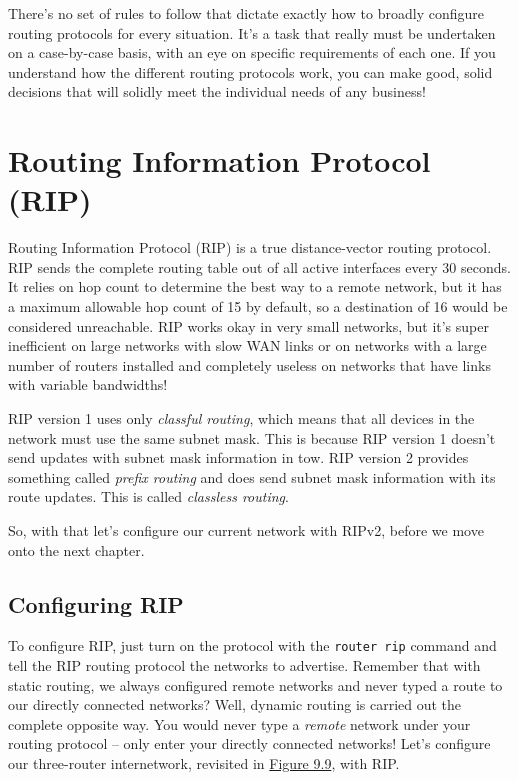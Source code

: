 There's no set of rules to follow that dictate exactly how to broadly configure routing protocols for every situation.
It's a task that really must be undertaken on a case-by-case basis, with an eye on specific requirements of each one.
If you understand how the different routing protocols work, you can make good, solid decisions that will solidly meet the individual needs of any business!



\section{Routing Information Protocol (RIP)}

Routing Information Protocol (RIP) is a true distance-vector routing
protocol. RIP sends the complete routing table out of all active
interfaces every 30 seconds. It relies on hop count to determine the
best way to a remote network, but it has a maximum allowable hop count
of 15 by default, so a destination of 16 would be considered
unreachable. RIP works okay in very small networks, but it's super
inefficient on large networks with slow WAN
\protect\hypertarget{c09.xhtmlux5cux23Page_393}{}{}links or on networks
with a large number of routers installed and completely useless on
networks that have links with variable bandwidths!

RIP version 1 uses only \emph{classful routing}, which means that all
devices in the network must use the same subnet mask. This is because
RIP version 1 doesn't send updates with subnet mask information in tow.
RIP version 2 provides something called \emph{prefix routing} and does
send subnet mask information with its route updates. This is called
\emph{classless routing}.

So, with that let's configure our current network with RIPv2, before we
move onto the next chapter.

\subsection{Configuring RIP}

To configure RIP, just turn on the protocol with the \texttt{router\ rip} command and tell the RIP routing protocol the networks to advertise.
Remember that with static routing, we always configured remote networks and never typed a route to our directly connected networks?
Well, dynamic routing is carried out the complete opposite way.
You would never type a \emph{remote} network under your routing protocol -- only enter your directly connected networks!
Let's configure our three-router internetwork, revisited in \protect\hyperlink{c09.xhtmlux5cux23figure9-9}{Figure 9.9}, with RIP.

